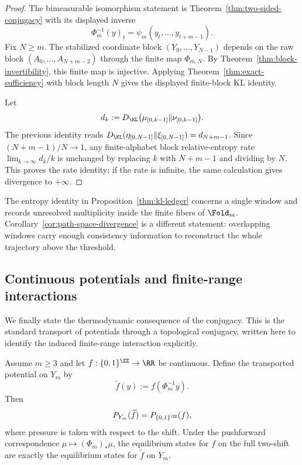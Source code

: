 \begin{proof}
The bimeasurable isomorphism statement is Theorem~\ref{thm:two-sided-conjugacy}
with its displayed inverse
\[
\Phi_m^{-1}(y)_t=\psi_m(y_t,\ldots,y_{t+m-1}).
\]
Fix $N\ge m$.  The stabilized coordinate block
$(Y_0,\ldots,Y_{N-1})$ depends on the raw block
$(A_0,\ldots,A_{N+m-2})$ through the finite map $\Phi_{m,N}$.  By
Theorem~\ref{thm:block-invertibility}, this finite map is injective.  Applying
Theorem~\ref{thm:exact-sufficiency} with block length $N$ gives the displayed
finite-block KL identity.

Let
\[
d_k:=D_{\KL}\bigl(\mu_{[0,k-1]}\|\nu_{[0,k-1]}\bigr).
\]
The previous identity reads
$D_{\KL}(\eta_{[0,N-1]}\|\xi_{[0,N-1]})=d_{N+m-1}$.  Since
$(N+m-1)/N\to1$, any finite-alphabet block relative-entropy rate
$\lim_{k\to\infty}d_k/k$ is unchanged by replacing $k$ with $N+m-1$ and
dividing by $N$.  This proves the rate identity; if the rate is infinite, the
same calculation gives divergence to $+\infty$.
\end{proof}

\begin{remark}
The entropy identity in Proposition~\ref{thm:kl-ledger} concerns a single
window and records unresolved multiplicity inside the finite fibers of
$\Fold_m$. Corollary~\ref{cor:path-space-divergence} is a different statement:
overlapping windows carry enough consistency information to reconstruct the
whole trajectory above the threshold.
\end{remark}

\subsection{Continuous potentials and finite-range interactions}\label{sec:measurement:renorm}

We finally state the thermodynamic consequence of the conjugacy. This is the
standard transport of potentials through a topological conjugacy, written here
to identify the induced finite-range interaction explicitly.

\begin{theorem}\label{thm:continuous-potentials}
Assume $m\ge3$ and let $f:\{0,1\}^{\ZZ}\to\RR$ be continuous.  Define the
transported potential on $Y_m$ by
\[
\widetilde f(y):=f(\Phi_m^{-1}y).
\]
Then
\[
P_{Y_m}(\widetilde f)=P_{\{0,1\}^{\ZZ}}(f),
\]
where pressure is taken with respect to the shift.  Under the pushforward
correspondence $\mu\mapsto(\Phi_m)_*\mu$, the equilibrium states for $f$ on
the full two-shift are exactly the equilibrium states for $\widetilde f$ on
$Y_m$.
\end{theorem}

